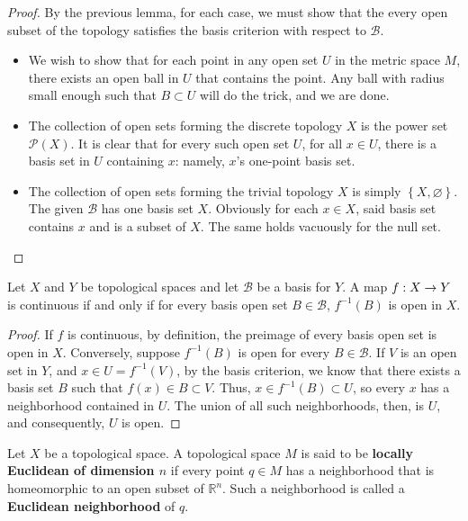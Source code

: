 \documentclass{mathnotes}
\begin{document}
\begin{proof}
    By the previous lemma, for each case, we must show that the every open subset of the topology satisfies the basis criterion with
    respect to $\mathcal{B}$.
    \begin{itemize}
        \item We wish to show that for each point in any open set $U$ in the metric space $M$, there exists an open ball in $U$
            that contains the point. Any ball with radius small enough such that $B\subset U$ will do the trick, and we are done.
        \item The collection of open sets forming the discrete topology $X$ is the power set $\mathcal{P}(X)$. It is clear that for every
            such open set $U$, for all $x\in U$, there is a basis set in $U$ containing $x$: namely, $x$'s one-point basis set.
        \item The collection of open sets forming the trivial topology $X$ is simply $\left\{ X,\varnothing \right\}$. The given $\mathcal{B}$
            has one basis set $X$. Obviously for each $x\in X$, said basis set contains $x$ and is a subset of $X$. The same holds
            vacuously for the null set.
    \end{itemize}
\end{proof}


\begin{lem}
    Let $X$ and $Y$ be topological spaces and let $\mathcal{B}$ be a basis for $Y$. A map $f:X\rightarrow Y$ is continuous if and only if for every
    basis open set $B\in\mathcal{B}$, $f^{-1}(B)$ is open in $X$.
\end{lem}

\begin{proof}
    If $f$ is continuous, by definition, the preimage of every basis open set is open in $X$. Conversely, suppose $f^{-1}(B)$ is open for every
    $B\in\mathcal{B}$. If $V$ is an open set in $Y$, and $x\in U=f^{-1}(V)$, by the basis criterion, we know that there exists a basis set $B$
    such that $f(x)\in B\subset V$. Thus, $x\in f^{-1}(B)\subset U$, so every $x$ has a neighborhood contained in $U$. The union of all such
    neighborhoods, then, is $U$, and consequently, $U$ is open.
\end{proof}

\begin{defn}
    Let $X$ be a topological space. A topological space $M$ is said to be \textbf{locally Euclidean of dimension $n$} if every point $q\in M$
    has a neighborhood that is homeomorphic to an open subset of $\mathbb{R}^n$. Such a neighborhood is called a \textbf{Euclidean neighborhood}
    of $q$.
\end{defn}
\end{document}
